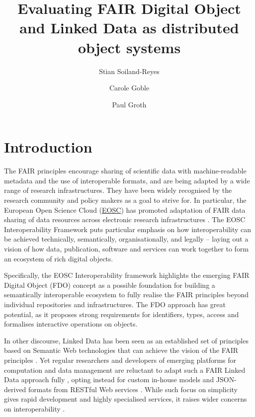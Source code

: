 \documentclass[fleqn,10pt,NOlineno]{wlpeerjlua}
\title{Evaluating FAIR Digital Object and Linked Data as distributed object systems}
\author[1,2]{Stian Soiland-Reyes} %
\author[1]{Carole Goble}          %
\author[2]{Paul Groth}            %
\affil[1]{Department of Computer Science, The University of Manchester, UK}
\affil[2]{Informatics Institute, Faculty of Science, University of Amsterdam, NL }
\begin{document}
\flushbottom
\maketitle
\thispagestyle{empty}



\section*{Introduction}\label{sec:introduction}

The FAIR principles \autocite{wilkinsonFAIRGuidingPrinciples2016e} encourage sharing of scientific data with machine-readable metadata and the use of interoperable formats, and are being adapted by a wide range of research infrastructures. They have been widely recognised by the research community and policy makers as a goal to strive for. In particular, the European Open Science Cloud (\href{https://www.eosc.eu/}{EOSC}) has promoted adaptation of FAIR data sharing of data resources across electronic research infrastructures \autocite{monsCloudyIncreasinglyFAIR2017b}. The EOSC Interoperability Framework \autocite{corchoEOSCInteroperabilityFramework2021b} puts particular emphasis on how interoperability can be achieved technically, semantically, organisationally, and legally -- laying out a vision of how data, publication, software and services can work together to form an ecosystem of rich digital objects.

Specifically, the EOSC Interoperability framework highlights the emerging FAIR Digital Object (FDO) concept \autocite{schultesFAIRPrinciplesDigital2019a} as a possible foundation for building a semantically interoperable ecosystem to fully realise the FAIR principles beyond individual repositories and infrastructures. The FDO approach has great potential, as it proposes strong requirements for identifiers, types, access and formalises interactive operations on objects.

In other discourse, Linked Data \autocite{bizerLinkedDataStory2009a} has been seen as an established set of principles based on Semantic Web technologies that can achieve the vision of the FAIR principles \autocite{boninodasilvasantosFAIRDataPoints2016a,hasnainAssessingFAIRData2018a}. Yet regular researchers and developers of emerging platforms for computation and data management are reluctant to adapt such a FAIR Linked Data approach fully \autocite{verborghSemanticWebIdentity2020a}, opting instead for custom in-house models and JSON-derived formats from RESTful Web services \autocite{merono-penuelaConclusionFutureChallenges2021a,neumannAnalysisPublicREST2021a}. While such focus on simplicity gives rapid development and highly specialised services, it raises wider concerns on interoperability \autocite{turcoaneLinkedDataJSONLD2014a,wilkinsonWorkflowsWhenParts2022b}.
\end{document}
